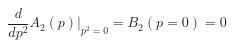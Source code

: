 \begin{equation}
\frac{d}{dp^2} A_2 (p)\Big|_{p^2=0} = B_2 (p=0) = 0 \label{conditions}
\end{equation}

